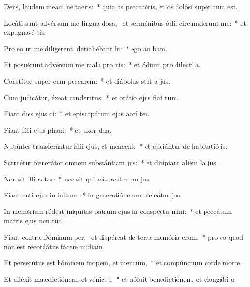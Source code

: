 \item Deus, laudem meam ne taeris:~* quia os peccatóris, et os dolósi super  tum est.
\item Locúti sunt advérsum me lingua dosa,~\pscross{} et sermónibus ódii circumderunt me:~* et expugnavé  tis.
\item Pro eo ut me dilígerent, detrahébant hi:~* ego au bam.
\item Et posuérunt advérsum me mala pro nis:~* et ódium pro dilecti a.
\item Constítue super eum peccarem:~* et diábolus stet a  jus.
\item Cum judicátur, éxeat condemtus:~* et orátio ejus fiat  tum.
\item Fiant dies ejus ci:~* et episcopátum ejus accí ter.
\item Fiant fílii ejus phani:~* et uxor  dua.
\item Nutántes transferántur fílii ejus, et mencent:~* et ejiciántur de habitatió is.
\item Scrutétur fœnerátor omnem substántiam jus:~* et dirípiant aliéni la jus.
\item Non sit illi adtor:~* nec sit qui misereátur pu jus.
\item Fiant nati ejus in initum:~* in generatióne una deleátur  jus.
\item In memóriam rédeat iníquitas patrum ejus in conspéctu mini:~* et peccátum matris ejus non tur.
\item Fiant contra Dóminum per,~\pscross{} et dispéreat de terra memória erum:~* pro eo quod non est recordátus fácere midiam.
\item Et persecútus est hóminem ínopem, et mencum,~* et compúnctum corde morre.
\item Et diléxit maledictiónem, et véniet i:~* et nóluit benedictiónem, et elongábi  o.
